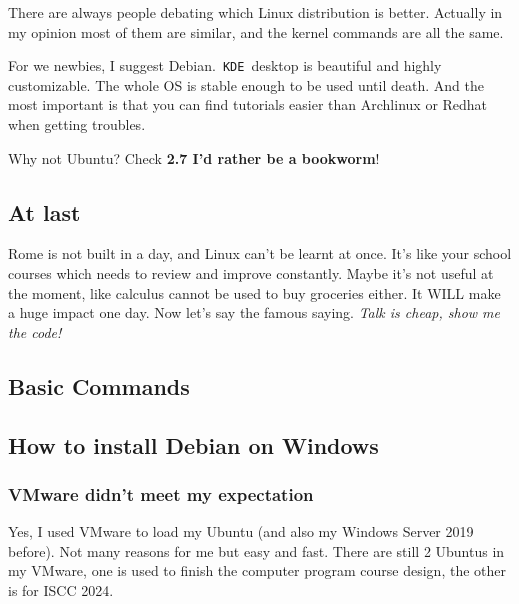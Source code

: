 \documentclass[12pt]{ctexart}
\newenvironment{mdquote}
{%
  \par\noindent
  \begin{list}{}{%
      \setlength{\leftmargin}{1em}%
      \setlength{\rightmargin}{0pt}%
      \setlength{\itemindent}{0pt}%
      \setlength{\listparindent}{\parindent}%
      \setlength{\topsep}{0.5\baselineskip}%
  }
  \item[\textbf{>}\ ]\itshape
}
{\end{list}\par}
\begin{document}
There are always people debating which Linux distribution is better.
Actually in my opinion most of them are similar, and the kernel commands
are all the same.

For we newbies, I suggest Debian.\ \texttt{KDE}\ desktop is beautiful and
highly customizable. The whole OS is stable enough to be used until
death. And the most important is that you can find tutorials easier than
Archlinux or Redhat when getting troubles.

\begin{mdquote}
Why not Ubuntu? Check \textbf{2.7 I'd rather be a
bookworm}!
\end{mdquote}

\subsection*{\textbf{At last}}

Rome is not built in a day, and Linux can't be learnt at
once. It's like your school courses which needs to
review and improve constantly. Maybe it's not useful at
the moment, like calculus cannot be used to buy groceries either. It
WILL make a huge impact one day. Now let's say the
famous saying. \emph{Talk is cheap, show me the code!}

\newpage
\thispagestyle{empty}
\begin{center}
    \vspace*{96pt}
    \fontsize{60}{60}\par
    \fontsize{26}{31.2}\section{\textbf{Basic Commands}}\par %
    \vspace{25pt}
    \fontsize{18}{21.6}\par %
    \vfill
\end{center}

\fontsize{12}{14}
\newpage
\subsection{\textbf{How to install Debian on Windows}}

\subsubsection{\textbf{VMware didn't meet my expectation}}
Yes, I used VMware to load my Ubuntu (and also my Windows Server 2019
before). Not many reasons for me but easy and fast. There are still 2
Ubuntus in my VMware, one is used to finish the computer program course
design, the other is for ISCC 2024.
\end{document}
